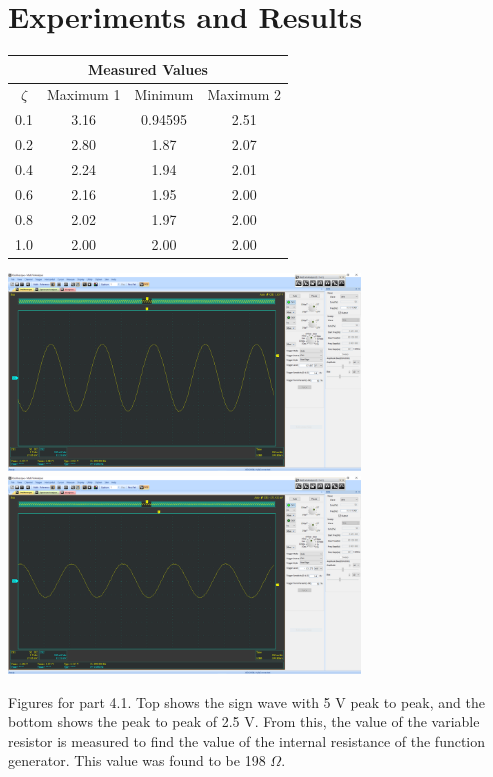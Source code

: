 \documentclass[12pt]{article}
\newcommand{\objects}[2]{%
  \leavevmode\vbox{\hbox{#1}\nointerlineskip\hbox{#2}}%
}
\begin{document}
    \section*{Experiments and Results}
    \begin{table}[h]
        \centering
        \begin{tabular}{cccc}
            \toprule
            \multicolumn{4}{c}{Measured Values} \\
            \midrule
            $ \zeta $ & Maximum 1 & Minimum & Maximum 2 \\
            \midrule
            0.1 & 3.16 & 0.94595 & 2.51 \\
            0.2 & 2.80 & 1.87 & 2.07 \\
            0.4 & 2.24 & 1.94 & 2.01 \\
            0.6 & 2.16 & 1.95 & 2.00 \\
            0.8 & 2.02 & 1.97 & 2.00 \\
            1.0 & 2.00 & 2.00 & 2.00 \\
            \bottomrule
        \end{tabular}
    \end{table}
    \begin{center}
        \objects
            {\includegraphics[width=0.7\textwidth]{4.1a.png}}
            {\includegraphics[width=0.7\textwidth]{4.1b.png}}
    \end{center}
    \begin{center}
        Figures for part 4.1. Top shows the sign wave with 5 V peak to peak, and the bottom shows the peak to peak of 2.5 V. From this, the value of the variable resistor is measured to find the value of the internal resistance of the function generator. This value was found to be 198 $ \Omega $.
    \end{center}
\end{document}

